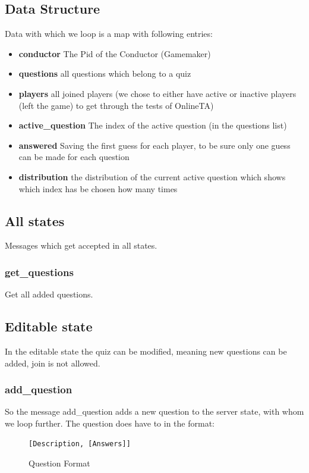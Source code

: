 \documentclass[12pt,a4paper]{article}
\begin{document}
\subsection{Data Structure}
Data with which we loop is a map with following entries:
\begin{itemize}
	\item \textbf{conductor} The Pid of the Conductor (Gamemaker)
	\item \textbf{questions} all questions which belong to a quiz
	\item \textbf{players} all joined players (we chose to either have active or inactive players (left the game) to get through the tests of OnlineTA)
	\item \textbf{active\_question} The index of the active question (in the questions list)
	\item \textbf{answered} Saving the first guess for each player, to be sure only one guess can be made for each question
	\item \textbf{distribution} the distribution of the current active question which shows which index has be chosen how many times
\end{itemize}

\subsection{All states}
Messages which get accepted in all states.
\subsubsection{get\_questions}
Get all added questions.

\subsection{Editable state}
In the editable state the quiz can be modified, meaning new questions can be added, join is not allowed.

\subsubsection{add\_question}
So the message add\_question adds a new question to the server state, with whom we loop further.
The question does have to in the format:
\begin{figure}
\begin{verbatim}
[Description, [Answers]]
\end{verbatim}
\caption{Question Format}
\end{figure}
\end{document}
